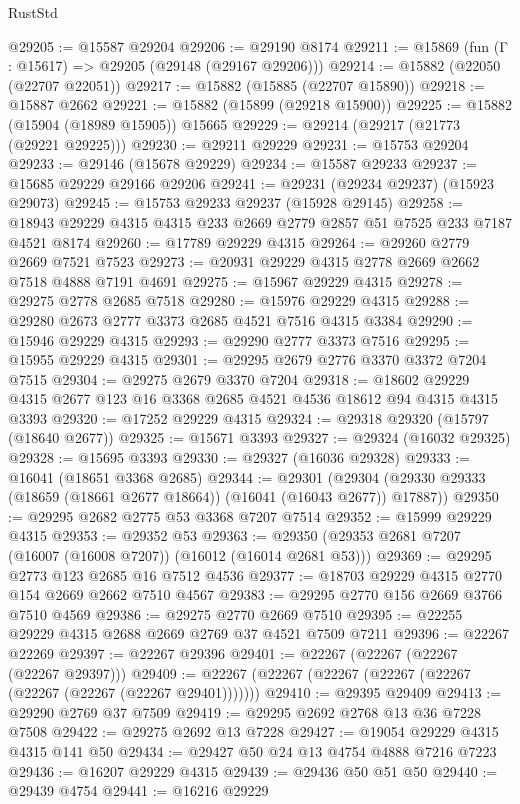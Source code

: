 \begin{lexlean}{RustStd}
\begin{coremodule}
@29205 := @15587 @29204
@29206 := @29190 @8174
@29211 := @15869 (fun (Γ : @15617) => @29205 (@29148 (@29167 @29206)))
@29214 := @15882 (@22050 (@22707 @22051))
@29217 := @15882 (@15885 (@22707 @15890))
@29218 := @15887 @2662
@29221 := @15882 (@15899 (@29218 @15900))
@29225 := @15882 (@15904 (@18989 @15905)) @15665
@29229 := @29214 (@29217 (@21773 (@29221 @29225)))
@29230 := @29211 @29229
@29231 := @15753 @29204
@29233 := @29146 (@15678 @29229)
@29234 := @15587 @29233
@29237 := @15685 @29229 @29166 @29206
@29241 := @29231 (@29234 @29237) (@15923 @29073)
@29245 := @15753 @29233 @29237 (@15928 @29145)
@29258 := @18943 @29229 @4315 @4315 @233 @2669 @2779 @2857 @51 @7525 @233 @7187 @4521 @8174
@29260 := @17789 @29229 @4315
@29264 := @29260 @2779 @2669 @7521 @7523
@29273 := @20931 @29229 @4315 @2778 @2669 @2662 @7518 @4888 @7191 @4691
@29275 := @15967 @29229 @4315
@29278 := @29275 @2778 @2685 @7518
@29280 := @15976 @29229 @4315
@29288 := @29280 @2673 @2777 @3373 @2685 @4521 @7516 @4315 @3384
@29290 := @15946 @29229 @4315
@29293 := @29290 @2777 @3373 @7516
@29295 := @15955 @29229 @4315
@29301 := @29295 @2679 @2776 @3370 @3372 @7204 @7515
@29304 := @29275 @2679 @3370 @7204
@29318 := @18602 @29229 @4315 @2677 @123 @16 @3368 @2685 @4521 @4536 @18612 @94 @4315 @4315 @3393
@29320 := @17252 @29229 @4315
@29324 := @29318 @29320 (@15797 (@18640 @2677))
@29325 := @15671 @3393
@29327 := @29324 (@16032 @29325)
@29328 := @15695 @3393
@29330 := @29327 (@16036 @29328)
@29333 := @16041 (@18651 @3368 @2685)
@29344 := @29301
    (@29304 (@29330 @29333 (@18659 (@18661 @2677 @18664)) (@16041 (@16043 @2677)) @17887))
@29350 := @29295 @2682 @2775 @53 @3368 @7207 @7514
@29352 := @15999 @29229 @4315
@29353 := @29352 @53
@29363 := @29350 (@29353 @2681 @7207 (@16007 (@16008 @7207)) (@16012 (@16014 @2681 @53)))
@29369 := @29295 @2773 @123 @2685 @16 @7512 @4536
@29377 := @18703 @29229 @4315 @2770 @154 @2669 @2662 @7510 @4567
@29383 := @29295 @2770 @156 @2669 @3766 @7510 @4569
@29386 := @29275 @2770 @2669 @7510
@29395 := @22255 @29229 @4315 @2688 @2669 @2769 @37 @4521 @7509 @7211
@29396 := @22267 @22269
@29397 := @22267 @29396
@29401 := @22267 (@22267 (@22267 (@22267 @29397)))
@29409 := @22267 (@22267 (@22267 (@22267 (@22267 (@22267 (@22267 (@22267 @29401)))))))
@29410 := @29395 @29409
@29413 := @29290 @2769 @37 @7509
@29419 := @29295 @2692 @2768 @13 @36 @7228 @7508
@29422 := @29275 @2692 @13 @7228
@29427 := @19054 @29229 @4315 @4315 @141 @50
@29434 := @29427 @50 @24 @13 @4754 @4888 @7216 @7223
@29436 := @16207 @29229 @4315
@29439 := @29436 @50 @51 @50
@29440 := @29439 @4754
@29441 := @16216 @29229

\end{coremodule}
\end{lexlean}
